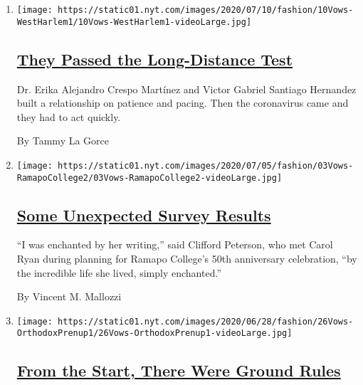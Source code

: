 \begin{enumerate}
\def\labelenumi{\arabic{enumi}.}
\item
  \texttt{[image: https://static01.nyt.com/images/2020/07/10/fashion/10Vows-WestHarlem1/10Vows-WestHarlem1-videoLarge.jpg]}

  \hypertarget{they-passed-the-long-distance-test}{%
  \subsection{\texorpdfstring{\href{/2020/07/10/fashion/weddings/they-passed-the-long-distance-test.html}{They
  Passed the Long-Distance
  Test}}{They Passed the Long-Distance Test}}\label{they-passed-the-long-distance-test}}

  Dr. Erika Alejandro Crespo Martínez and Victor Gabriel Santiago
  Hernandez built a relationship on patience and pacing. Then the
  coronavirus came and they had to act quickly.

  By Tammy La Gorce
\item
  \texttt{[image: https://static01.nyt.com/images/2020/07/05/fashion/03Vows-RamapoCollege2/03Vows-RamapoCollege2-videoLarge.jpg]}

  \hypertarget{some-unexpected-survey-results}{%
  \subsection{\texorpdfstring{\href{/2020/07/03/fashion/weddings/some-unexpected-survey-results.html}{Some
  Unexpected Survey
  Results}}{Some Unexpected Survey Results}}\label{some-unexpected-survey-results}}

  ``I was enchanted by her writing,'' said Clifford Peterson, who met
  Carol Ryan during planning for Ramapo College's 50th anniversary
  celebration, ``by the incredible life she lived, simply enchanted.''

  By Vincent M. Mallozzi
\item
  \texttt{[image: https://static01.nyt.com/images/2020/06/28/fashion/26Vows-OrthodoxPrenup1/26Vows-OrthodoxPrenup1-videoLarge.jpg]}

  \hypertarget{from-the-start-there-were-ground-rules}{%
  \subsection{\texorpdfstring{\href{/2020/06/26/fashion/weddings/from-the-start-there-were-ground-rules.html}{From
  the Start, There Were Ground
  Rules}}{From the Start, There Were Ground Rules}}\label{from-the-start-there-were-ground-rules}}


\end{enumerate}
